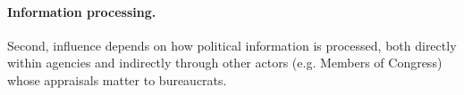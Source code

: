 \paragraph{Information processing.} Second, influence depends on how political information is processed, both directly within agencies and indirectly through other actors (e.g. Members of Congress) whose appraisals matter to bureaucrats.






